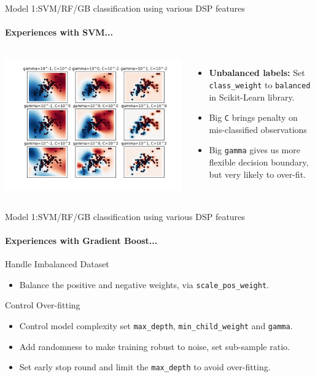 \documentclass{beamer}
\begin{document}
\begin{frame}{Model 1:SVM/RF/GB classification using various DSP features}
  \framesubtitle{Experiences with SVM...}
  \begin{columns}
    \includegraphics[scale=0.3]{img/coaram.png}
    \begin{itemize}
      \item \textbf{Unbalanced labels:} Set \texttt{class\_weight} to \texttt{balanced} in
        Scikit-Learn library.
      \item Big \texttt{C} brings penalty on mis-classified observations

      \item Big \texttt{gamma} gives us more flexible decision boundary, but very
          likely to over-fit.
    \end{itemize}
  \end{columns}
\end{frame}


\begin{frame}{Model 1:SVM/RF/GB classification using various DSP features}
  \framesubtitle{Experiences with Gradient Boost...}

  \begin{block}{Handle Imbalanced Dataset}
    \begin{itemize}
    \item Balance the positive and negative weights, via \texttt{scale\_pos\_weight}.
    \end{itemize}
  \end{block}


  \begin{block}{Control Over-fitting}
    \begin{itemize}
    \item Control model complexity set \texttt{max\_depth}, \texttt{min\_child\_weight} and \texttt{gamma}.
    \item Add randomness to make training robust to noise, set sub-sample ratio.
    \item Set early stop round and limit the \texttt{max\_depth} to avoid over-fitting.
    \end{itemize}
  \end{block}

\end{frame}
\end{document}
